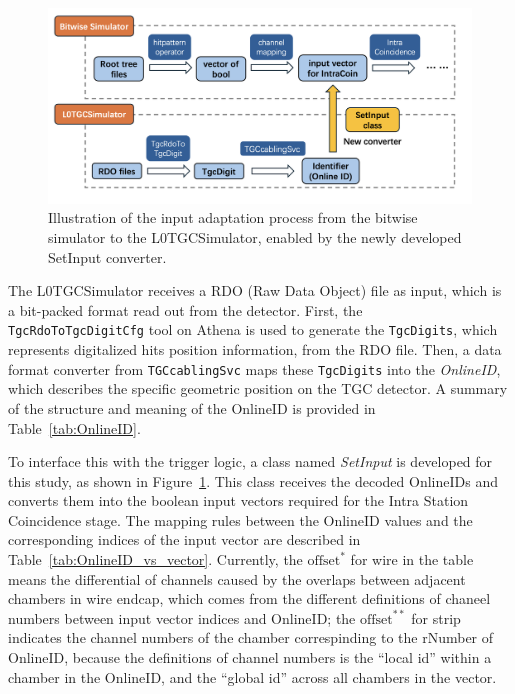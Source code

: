 \begin{figure}[htbp]
  \centering
  \includegraphics[width=1.0\textwidth]{figs/chapter5/input_adaptation.png}
  \caption{Illustration of the input adaptation process from the bitwise simulator to the L0TGCSimulator, enabled by the newly developed SetInput converter.}
  \label{fig:input_adaptation}
\end{figure}

The L0TGCSimulator receives a RDO (Raw Data Object) file as input, which is a bit-packed format read out from the detector. First, the \\\texttt{TgcRdoToTgcDigitCfg} tool on Athena is used to generate the \texttt{TgcDigits}, which represents digitalized hits position information, from the RDO file. Then, a data format converter from \texttt{TGCcablingSvc} maps these \texttt{TgcDigits} into the \textit{OnlineID}, which describes the specific geometric position on the TGC detector. A summary of the structure and meaning of the OnlineID is provided in Table~\ref{tab:OnlineID}.


To interface this with the trigger logic, a class named \textit{SetInput} is developed for this study, as shown in Figure~\ref{fig:input_adaptation}. This class receives the decoded OnlineIDs and converts them into the boolean input vectors required for the Intra Station Coincidence stage. The mapping rules between the OnlineID values and the corresponding indices of the input vector are described in Table~\ref{tab:OnlineID_vs_vector}. Currently, the $\text{offset}^{*}$ for wire in the table means the differential of channels caused by the overlaps between adjacent chambers in wire endcap, which comes from the different definitions of chaneel numbers between input vector indices and OnlineID; the $\text{offset}^{**}$ for strip indicates the channel numbers of the chamber correspinding to the rNumber of OnlineID, because the definitions of channel numbers is the ``local id'' within a chamber in the OnlineID, and the ``global id'' across all chambers in the vector.


